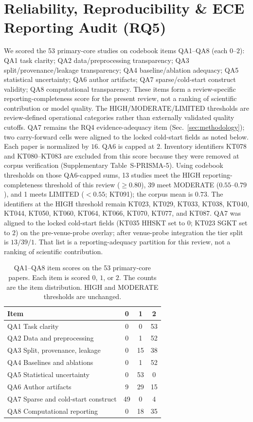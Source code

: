 \documentclass[lettersize,journal]{IEEEtran}
\begin{document}
\section{Reliability, Reproducibility \& ECE Reporting Audit (RQ5)}
\label{sec:reliability}
We scored the 53 primary-core studies on codebook items QA1--QA8 (each $0$--$2$): QA1 task clarity; QA2 data/preprocessing transparency; QA3 split/provenance/leakage transparency; QA4 baseline/ablation adequacy; QA5 statistical uncertainty; QA6 author artifacts; QA7 sparse/cold-start construct validity; QA8 computational transparency. These items form a review-specific reporting-completeness score for the present review, not a ranking of scientific contribution or model quality. The HIGH/MODERATE/LIMITED thresholds are review-defined operational categories rather than externally validated quality cutoffs. QA7 remains the RQ4 evidence-adequacy item (Sec.~\ref{sec:methodology}); two carry-forward cells were aligned to the locked cold-start fields as noted below. Each paper is normalized by $16$. QA6 is capped at $2$. Inventory identifiers KT078 and KT080--KT083 are excluded from this score because they were removed at corpus verification (Supplementary Table~S-PRISMA-5).
Using codebook thresholds on those QA6-capped sums, 13 studies meet the HIGH reporting-completeness threshold of this review ($\ge 0.80$), 39 meet MODERATE ($0.55$--$0.79$), and 1 meets LIMITED ($< 0.55$; KT091); the corpus mean is $0.73$. The identifiers at the HIGH threshold remain KT023, KT029, KT033, KT038, KT040, KT044, KT050, KT060, KT064, KT066, KT070, KT077, and KT087. QA7 was aligned to the locked cold-start fields (KT035 HHSKT set to $0$; KT023 SGKT set to $2$) on the pre-venue-probe overlay; after venue-probe integration the tier split is $13/39/1$. That list is a reporting-adequacy partition for this review, not a ranking of scientific contribution.
\begin{table}[t]
\caption{QA1--QA8 item scores on the 53 primary-core papers. Each item is scored $0$, $1$, or $2$. The counts are the item distribution. HIGH and MODERATE thresholds are unchanged.}
\label{tab:qa_distribution}
\centering
\footnotesize
\setlength{\tabcolsep}{6pt}
\begin{tabular}{@{}lccc@{}}
\toprule
\textbf{Item} & \textbf{0} & \textbf{1} & \textbf{2} \\
\midrule
QA1 Task clarity & 0 & 0 & 53 \\
QA2 Data and preprocessing & 0 & 1 & 52 \\
QA3 Split, provenance, leakage & 0 & 15 & 38 \\
QA4 Baselines and ablations & 0 & 1 & 52 \\
QA5 Statistical uncertainty & 0 & 53 & 0 \\
QA6 Author artifacts & 9 & 29 & 15 \\
QA7 Sparse and cold-start construct & 49 & 0 & 4 \\
QA8 Computational reporting & 0 & 18 & 35 \\
\bottomrule
\end{tabular}
\end{table}
\end{document}
